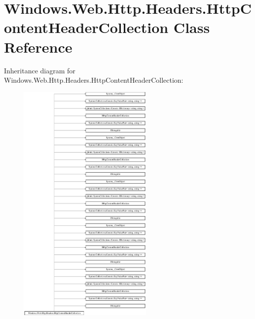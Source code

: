 \hypertarget{class_windows_1_1_web_1_1_http_1_1_headers_1_1_http_content_header_collection}{}\section{Windows.\+Web.\+Http.\+Headers.\+Http\+Content\+Header\+Collection Class Reference}
\label{class_windows_1_1_web_1_1_http_1_1_headers_1_1_http_content_header_collection}
Inheritance diagram for Windows.\+Web.\+Http.\+Headers.\+Http\+Content\+Header\+Collection\+:\begin{figure}[H]
\begin{center}
\leavevmode
\includegraphics[height=12.000000cm]{class_windows_1_1_web_1_1_http_1_1_headers_1_1_http_content_header_collection}
\end{center}
\end{figure}
